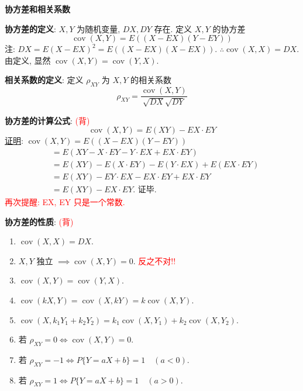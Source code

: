 \documentclass[padp]{ExBook}
\DeclareMathOperator{\cov}{cov}
\begin{document}
\hrulefill
\vspace{1em}

\textbf{协方差和相关系数}
\vspace{1em}

\textbf{协方差的定义}:
$X,Y$ 为随机变量, $DX, DY$ 存在.
定义 $X,Y$ 的协方差
$$ \cov(X,Y) = E((X-EX)(Y-EY)) $$
注: $DX = E(X-EX)^2 = E((X-EX)(X-EX))$.
$\therefore \cov(X,X) = DX$.
由定义, 显然 $\cov(X,Y) = \cov(Y,X)$.

\vspace{1em}
\textbf{相关系数的定义}:
定义 $\rho_{XY}$ 为 $X,Y$ 的相关系数
$$ \rho_{XY} = \frac{\cov(X,Y)}{\sqrt{DX}\sqrt{DY}} $$

\vspace{1em}
\textbf{协方差的计算公式}: \textcolor{red}{(背)}
$$ \cov(X,Y) = E(XY) - EX \cdot EY $$
\underline{证明}: $\cov(X,Y) = E((X-EX)(Y-EY))$
\begin{align*}
    &= E(XY - X \cdot EY - Y \cdot EX + EX \cdot EY) \\
    &= E(XY) - E(X \cdot EY) - E(Y \cdot EX) + E(EX \cdot EY) \\
    &= E(XY) - EY \cdot EX - EX \cdot EY + EX \cdot EY \\
    &= E(XY) - EX \cdot EY. \text{ 证毕.}
\end{align*}
\textcolor{red}{再次提醒: EX, EY 只是一个常数.}

\vspace{1em}
\textbf{协方差的性质}: \textcolor{red}{(背)}
\begin{enumerate}[label=(\arabic*), itemsep=3pt]
    \item $\cov(X,X) = DX$.
    \item $X,Y$ 独立 $\implies \cov(X,Y)=0$. \textcolor{red}{反之不对!!}
    \item $\cov(X,Y) = \cov(Y,X)$.
    \item $\cov(kX, Y) = \cov(X, kY) = k\cov(X,Y)$.
    \item $\cov(X, k_1Y_1+k_2Y_2) = k_1\cov(X,Y_1) + k_2\cov(X,Y_2)$.
    \item 若 $\rho_{XY}=0 \iff \cov(X,Y)=0$.
    \item 若 $\rho_{XY}=-1 \iff P\{Y=aX+b\}=1 \quad (a<0)$.
    \item 若 $\rho_{XY}=1 \iff P\{Y=aX+b\}=1 \quad (a>0)$.
\end{enumerate}

\clearpage
\end{document}
